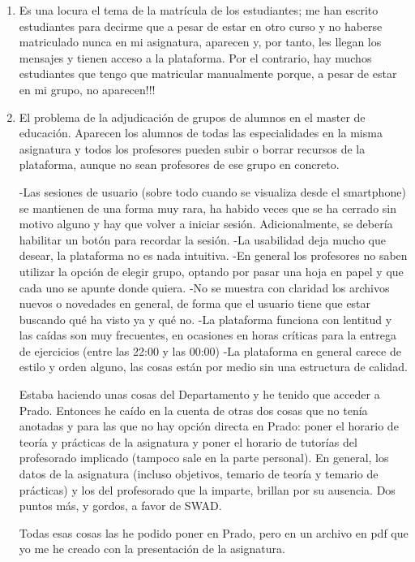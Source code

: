 \begin{enumerate}
\item Es una locura el tema de la matrícula de los estudiantes; me han escrito estudiantes para decirme que a pesar de estar en otro curso y no haberse matriculado nunca en mi asignatura, aparecen y, por tanto, les llegan los mensajes y tienen acceso a la plataforma. Por el contrario, hay muchos estudiantes que tengo que matricular manualmente porque, a pesar de estar en mi grupo, no aparecen!!! 

\item El problema de la adjudicación de grupos de alumnos en el master de educación. Aparecen los alumnos de todas las especialidades en la misma asignatura y todos los profesores pueden subir o borrar recursos de la plataforma, aunque no sean profesores de ese grupo en concreto.



-Las sesiones de usuario (sobre todo cuando se visualiza desde el smartphone) se mantienen de una forma muy rara, ha habido veces que se ha cerrado sin motivo alguno y hay que volver a iniciar sesión. Adicionalmente, se debería habilitar un botón para recordar la sesión.
-La usabilidad deja mucho que desear, la plataforma no es nada intuitiva.
-En general los profesores no saben utilizar la opción de elegir grupo, optando por pasar una hoja en papel y que cada uno se apunte donde quiera.
-No se muestra con claridad los archivos nuevos o novedades en general, de forma que el usuario tiene que estar buscando qué ha visto ya y qué no.
-La plataforma funciona con lentitud y las caídas son muy frecuentes, en ocasiones en horas críticas para la entrega de ejercicios (entre las 22:00 y las 00:00)
-La plataforma en general carece de estilo y orden alguno, las cosas están por medio sin una estructura de calidad.

  Estaba haciendo unas cosas del Departamento y he tenido que acceder a Prado. Entonces he caído en la cuenta de otras dos cosas que no tenía anotadas y para las que no hay opción directa en Prado: poner el horario de teoría y prácticas de la asignatura y poner el horario de tutorías del profesorado implicado (tampoco sale en la parte personal). En general, los datos de la asignatura (incluso objetivos, temario de teoría y temario de prácticas) y los del profesorado que la imparte, brillan por su ausencia. Dos puntos más, y gordos, a favor de SWAD.

  Todas esas cosas las he podido poner en Prado, pero en un archivo en pdf que yo me he creado con la presentación de la asignatura.


\end{enumerate}


